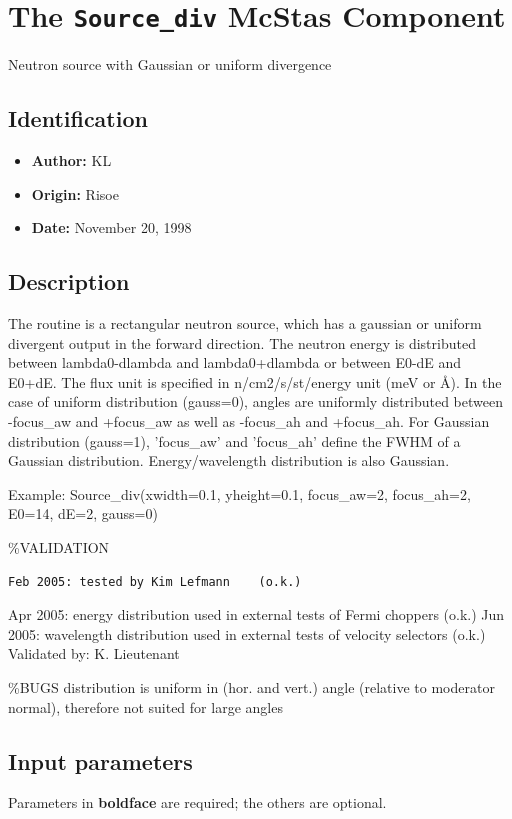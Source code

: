 \section{The \texttt{Source\_div} McStas Component}
Neutron source with Gaussian or uniform divergence

\subsection*{Identification}
\begin{itemize}
  \item \textbf{Author:} KL
  \item \textbf{Origin:} Risoe
  \item \textbf{Date:} November 20, 1998
\end{itemize}

\subsection*{Description}
The routine is a rectangular neutron source, which has a gaussian or uniform divergent output in the forward direction. The neutron energy is distributed between lambda0-dlambda and lambda0+dlambda or between E0-dE and E0+dE. The flux unit is specified in n/cm2/s/st/energy unit (meV or \AA{}). In the case of uniform distribution (gauss=0), angles are uniformly distributed between -focus\_aw and +focus\_aw as well as -focus\_ah and +focus\_ah. For Gaussian distribution (gauss=1), 'focus\_aw' and 'focus\_ah' define the FWHM of a Gaussian distribution. Energy/wavelength distribution is also Gaussian.

Example: Source\_div(xwidth=0.1, yheight=0.1, focus\_aw=2, focus\_ah=2, E0=14, dE=2, gauss=0)

\%VALIDATION

\begin{verbatim}
Feb 2005: tested by Kim Lefmann    (o.k.)
\end{verbatim}

Apr 2005: energy distribution used in external tests of Fermi choppers (o.k.) Jun 2005: wavelength distribution used in external tests of velocity selectors (o.k.) Validated by: K. Lieutenant

\%BUGS distribution is uniform in (hor. and vert.) angle (relative to moderator normal), therefore not suited for large angles

\subsection*{Input parameters}
Parameters in \textbf{boldface} are required; the others are optional.

